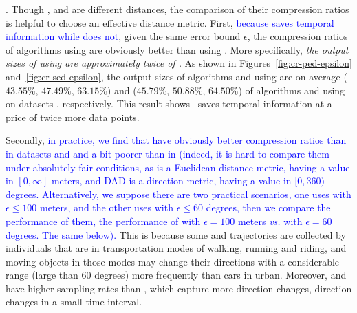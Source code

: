 .
Though \ped, \sed and \dad are different distances, the comparison of their compression ratios is helpful to choose an effective distance metric.
%
First, \textcolor{blue}{because \sed saves temporal information while \ped does not}, given the same error bound $\epsilon$, the compression ratios of algorithms using \ped are obviously better
than using \sed. More specifically, \emph{the output sizes of using \sed are approximately twice of \ped.}
%
As shown in Figures~\ref{fig:cr-ped-epsilon} and~\ref{fig:cr-sed-epsilon}, the output sizes of algorithms \tpa and \dpa
using \ped are on average ($43.55\%$, $47.49\%$, $63.15\%$) and ($45.79\%$,
$50.88\%$, $64.50\%$) of algorithms \tpa and \dpa using \sed on datasets \dSets, respectively.
%
%
This result shows ~\sed saves temporal information at a price of twice more data points.


Secondly, \textcolor{blue}{in practice, we find that \sed have obviously better compression ratios than \dad in datasets \geolife and \mopsi and a bit poorer than \dad in \ucar (indeed, it is hard to compare them under absolutely fair conditions, as \sed is a Euclidean distance metric, having a value in $[0, \infty]$ meters, and DAD is a direction metric,  having a value in $[0,360)$ degrees. Alternatively, we suppose there are two practical scenarios, one uses \sed with $\epsilon  \le  100$ meters, and the other uses \dad with $\epsilon \le 60$ degrees, then we compare the performance of them, \eg the performance of \sed with $\epsilon=100$ meters \emph{vs.} \dad with $\epsilon=60$ degrees. The same below).}
This is because some \geolife and \mopsi trajectories are collected by individuals that are in transportation modes of walking, running and riding, and moving objects in those modes may change their directions with a considerable range (\eg large than $60$ degrees) more frequently than cars in urban. Moreover, \geolife and \mopsi have higher sampling rates than \ucar, which capture more direction changes, \ie direction changes in a small time interval.




